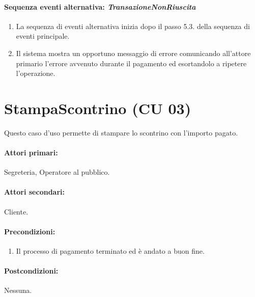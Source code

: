 \documentclass{article}
\begin{document}
	\paragraph{Sequenza eventi alternativa: \emph{TransazioneNonRiuscita}}
		\begin{enumerate}[itemsep=8pt,parsep=0pt]
				\item La sequenza di eventi alternativa inizia dopo il passo 5.3. della sequenza di eventi principale.
				\item Il sistema mostra un opportuno messaggio di errore comunicando all'attore primario l'errore avvenuto durante il pagamento ed esortandolo a ripetere l'operazione.
		\end{enumerate}



\newpage

\section*{StampaScontrino (CU 03)}

    \indent\indent Questo caso d'uso permette di stampare lo scontrino con l'importo pagato.
    
     
    \paragraph{Attori primari:}Segreteria, Operatore al pubblico.
	
	\paragraph{Attori secondari:}Cliente.
	
	\paragraph{Precondizioni:}
		\begin{enumerate}[itemsep=8pt,parsep=0pt]
			\item Il processo di pagamento terminato ed è andato a buon fine.
		\end{enumerate}
	
	\paragraph{Postcondizioni:} Nessuna.
	
\end{document}
